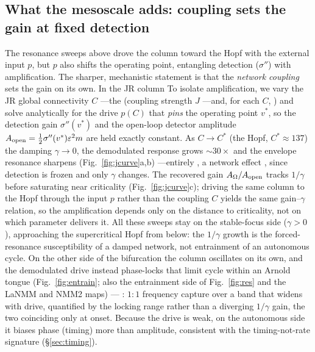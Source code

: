 \documentclass[11pt,a4paper]{article}
\newcommand{\Sig}{\sigma}
\newcommand{\half}{\tfrac{1}{2}}
\providecommand{\DIFaddtex}[1]{{\protect\color{blue} \sf #1}} %
\providecommand{\DIFdeltex}[1]{{\protect\color{red} \scriptsize #1}} %
\providecommand{\DIFaddbegin}{} %
\providecommand{\DIFaddend}{} %
\providecommand{\DIFdelbegin}{} %
\providecommand{\DIFdelend}{} %
\providecommand{\DIFadd}[1]{\texorpdfstring{\DIFaddtex{#1}}{#1}} %
\providecommand{\DIFdel}[1]{\texorpdfstring{\DIFdeltex{#1}}{}} %
\begin{document}
\subsection{What the mesoscale adds: coupling sets the gain at fixed detection}\label{sec:jcurve}
The resonance sweeps above drove the column toward the Hopf with the external input
$p$, but $p$ also shifts the operating point, entangling detection ($\Sig''$) with
amplification. \DIFdelbegin \DIFdel{The sharper, mechanistic statement is that the \emph{network coupling}
sets the gain on its own. In the JR column }\DIFdelend \DIFaddbegin \DIFadd{To isolate amplification, }\DIFaddend we vary the \DIFaddbegin \DIFadd{JR }\DIFaddend global connectivity $C$ \DIFdelbegin \DIFdel{---the
}\DIFdelend \DIFaddbegin \DIFadd{(}\DIFaddend coupling
strength $J$\DIFdelbegin \DIFdel{---and, for each $C$, }\DIFdelend \DIFaddbegin \DIFadd{) and }\DIFaddend solve analytically for the drive $p(C)$ that
\emph{pins} the operating point $v^*$, so the detection gain $\Sig''(v^*)$ and the
open-loop detector amplitude $A_{\rm open}=\half\Sig''(v^*)\varepsilon^2 m$ are held
exactly constant. As $C\!\to\!C^*$ (the Hopf, $C^*\!\approx\!137$) the damping
$\gamma\!\to\!0$, the demodulated response grows $\sim 30\times$ and the envelope
resonance sharpens (Fig.~\ref{fig:jcurve}a,b)\DIFdelbegin \DIFdel{---entirely }\DIFdelend \DIFaddbegin \DIFadd{, }\DIFaddend a network effect \DIFdelbegin \DIFdel{, }\DIFdelend since
detection is frozen and only $\gamma$ changes. The recovered gain
$A_\Omega/A_{\rm open}$ tracks $1/\gamma$ before saturating near criticality
(Fig.~\ref{fig:jcurve}c); driving the same column to the Hopf through the input $p$
rather than the coupling $C$ yields the same gain--$\gamma$ relation, so the
amplification depends only on the distance to criticality, not on which parameter
delivers it. All these sweeps stay on the stable-focus side ($\gamma>0$), approaching
the supercritical Hopf from below: the $1/\gamma$ growth is the forced-resonance
susceptibility of a damped network, not entrainment of an autonomous cycle. On the
other side of the bifurcation the column oscillates on its own, and the demodulated
drive instead phase-locks that limit cycle within an Arnold tongue
(Fig.~\ref{fig:entrain}; also the entrainment side of Fig.~\ref{fig:res} and the LaNMM
and NMM2 maps)\DIFdelbegin \DIFdel{---}\DIFdelend \DIFaddbegin \DIFadd{: }\DIFaddend $1{:}1$ frequency capture over a band that widens with drive,
quantified by the locking range rather than a diverging $1/\gamma$ gain, the two
coinciding only at onset. Because the drive is weak, on the autonomous side it biases
phase (timing) more than amplitude, consistent with the timing-not-rate signature
(\S\ref{sec:timing}).
\end{document}
